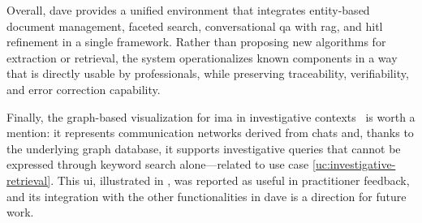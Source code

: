 Overall, \ac{dave} provides a unified environment that integrates entity-based document management, faceted search, conversational \acf{qa} with \ac{rag}, and \acl{hitl} refinement in a single framework. Rather than proposing new algorithms for extraction or retrieval, the system operationalizes known components in a way that is directly usable by professionals, while preserving traceability, verifiability, and error correction capability.

Finally, the graph-based visualization for \acl{ima} in investigative contexts~\cite{pozzi_wise_2025} is worth a mention: it represents communication networks derived from chats and, thanks to the underlying graph database, it supports investigative queries that cannot be expressed through keyword search alone---related to use case \ref{uc:investigative-retrieval}. This \ac{ui}, illustrated in , was reported as useful in practitioner feedback, and its integration with the other functionalities in \ac{dave} is a direction for future work.





